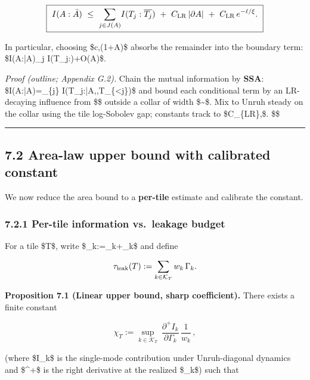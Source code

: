 \documentclass[
]{article}
\numberwithin{equation}{section}
\begin{document}
\[
\boxed{\
I(A:\bar A)\ \le\ \sum_{j\in J(A)}\! I(T_j:\overline{T_j})\ +\ C_{\rm LR}\,|\partial A|\ +\ C_{\rm LR}\,e^{-\ell/\xi}.
\ }
\]

In particular, choosing
\$\ell\ge c,\xi\log(1+\textbar{}\partial A\textbar)\$ absorbs the
remainder into the boundary term: \$I(A:\bar A)\le \sum\_j
I(T\_j:)+O(\textbar{}\partial A\textbar)\$.

\emph{Proof (outline; Appendix G.2).} Chain the mutual information by
\textbf{SSA}: \$I(A:\bar A)=\sum\_\{j\}
I\big(T\_j:\bar A,\big\textbar,T\_\{\textless j\}\big)\$ and bound each
conditional term by an LR-decaying influence from \$\overline{T\_j}\$
outside a collar of width \$\sim\ell\$. Mix to Unruh steady on the
collar using the tile log-Sobolev gap; constants track to
\$C\_\{\rm LR\},\xi\$. \$\square\$

\begin{center}\rule{0.5\linewidth}{0.5pt}\end{center}

\hypertarget{area-law-upper-bound-with-calibrated-constant}{%
\subsection{7.2 Area-law upper bound with calibrated
constant}\label{area-law-upper-bound-with-calibrated-constant}}

We now reduce the area bound to a \textbf{per-tile} estimate and
calibrate the constant.

\hypertarget{per-tile-information-vs.-leakage-budget}{%
\subsubsection{7.2.1 Per-tile information vs.~leakage
budget}\label{per-tile-information-vs.-leakage-budget}}

For a tile \$T\$, write \$\Gamma\_k:=\gamma\_k+\tilde\gamma\_k\$ and
define

\[
\tau_{\rm leak}(T):=\sum_{k\in\mathcal K_T} w_k\,\Gamma_k.
\]

\textbf{Proposition 7.1 (Linear upper bound, sharp coefficient).} There
exists a finite constant

\[
\chi_T:=\sup_{k\in\mathcal K_T}\ \frac{\partial^+ I_k}{\partial \Gamma_k}\,\frac{1}{w_k}\,,
\]

(where \$I\_k\$ is the single-mode contribution under Unruh-diagonal
dynamics and \$\partial\^{}+\$ is the right derivative at the realized
\$\Gamma\_k\$) such that
\end{document}
